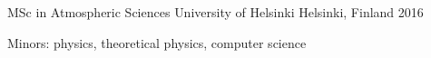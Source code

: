 

\begin{cventries}

  \cventry
    {MSc in Atmospheric Sciences} %
    {University of Helsinki} %
    {Helsinki, Finland} %
    {2016} %
    {
      \begin{cvitems} %
        \item {Minors: physics, theoretical physics, computer science}
      \end{cvitems}
    }

\end{cventries}
